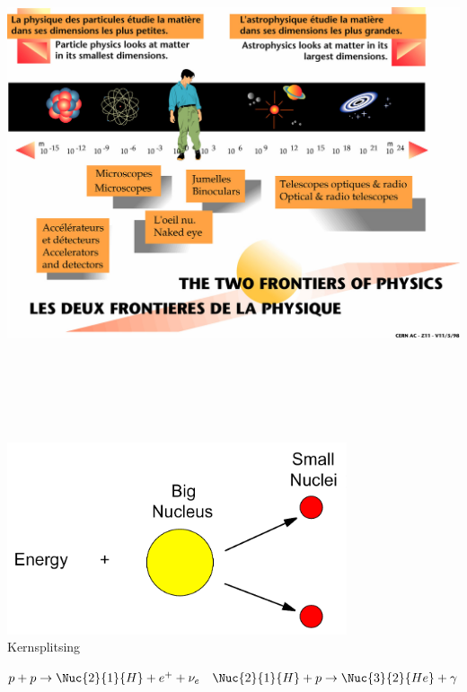 \onecolumn
\begin{center}
\includegraphics[keepaspectratio,height=14.9cm]{frontiers}
\end{center}

\Tr
{}%
\begin{center}
\includegraphics[keepaspectratio,width=10cm]{nuclear-fission}\\[2mm]
{\blue Kernsplitsing}
\end{center}
%
$p+p \rightarrow \Nuc{2}{1}{H}+e^{+}+\nu_{e} \quad \Nuc{2}{1}{H}+p \rightarrow \Nuc{3}{2}{He}+\gamma$ 

